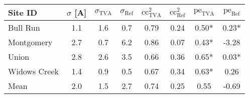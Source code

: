\begin{tabular}{l c c c c c c c}
Site ID & $\sigma$ [A] & $\sigma_\text{TVA}$ & $\sigma_\text{Ref}$ & $\text{cc}^2_\text{TVA}$ & $\text{cc}^2_\text{Ref}$ & $\text{pe}_\text{TVA}$ & $\text{pe}_\text{Ref}$ \\
\hline
Bull Run & 1.1 & 1.6 & 0.7 & 0.79 & 0.24 & 0.50* & 0.23* \\
Montgomery & 2.7 & 0.7 & 6.2 & 0.86 & 0.07 & 0.43* & -3.28 \\
Union & 2.8 & 2.6 & 3.5 & 0.66 & 0.36 & 0.65* & 0.03* \\
Widows Creek & 1.4 & 0.9 & 0.5 & 0.67 & 0.34 & 0.63* & 0.26 \\
\hline
Mean & 2.0 & 1.5 & 2.7 & 0.74 & 0.25 & 0.55 & -0.69 \\
\end{tabular}
